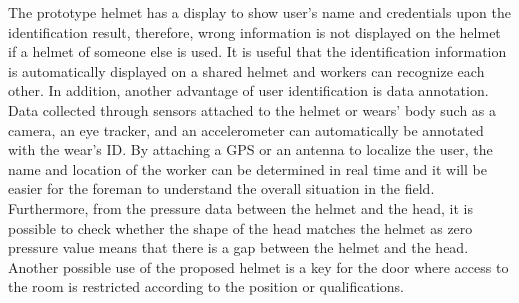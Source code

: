 \documentclass[sigchi,authordraft]{acmart}
\begin{document}
The prototype helmet has a display to show user's name and credentials upon the identification result, therefore, wrong information is not displayed on the helmet if a helmet of someone else is used. It is useful that the identification information is automatically displayed on a shared helmet and workers can recognize each other. In addition, another advantage of user identification is data annotation. Data collected through sensors attached to the helmet or wears' body such as a camera, an eye tracker, and an accelerometer can automatically be annotated with the wear's ID. By attaching a GPS or an antenna to localize the user\cite{disaster_en}, the name and location of the worker can be determined in real time and it will be easier for the foreman to understand the overall situation in the field. Furthermore, from the pressure data between the helmet and the head, it is possible to check whether the shape of the head matches the helmet as zero pressure value means that there is a gap between the helmet and the head.
Another possible use of the proposed helmet is a key for the door where access to the room is restricted according to the position or qualifications. \par
\end{document}
